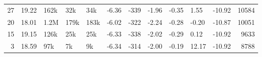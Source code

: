 \begin{table}[ht]
\begin{tabularx}{\textwidth}{@{} r *{10}{X} r @{}}
        \footnotesize 27 & 
        \cellcolor[HTML]{FFFFFF}\footnotesize 19.22 & 
        \cellcolor[HTML]{FFFFFF}\footnotesize 162k & 
        \cellcolor[HTML]{FDFFFE}\footnotesize 32k & 
        \cellcolor[HTML]{FDFEFE}\footnotesize 34k & 
        \cellcolor[HTML]{FFFFFF}\footnotesize -6.36 & 
        \cellcolor[HTML]{FFFFFF}\footnotesize -339 & 
        \cellcolor[HTML]{E2F4EB}\footnotesize -1.96 & 
        \footnotesize -0.35 & 
        \cellcolor[HTML]{A0D9BD}\footnotesize 1.55 & 
        \cellcolor[HTML]{F3FBF7}\footnotesize -10.92 & 
        \footnotesize 10584 \\

        \footnotesize 20 & 
        \cellcolor[HTML]{EDF7F2}\footnotesize 18.01 & 
        \cellcolor[HTML]{F5FBF8}\footnotesize 1.2M & 
        \cellcolor[HTML]{EFF9F4}\footnotesize 179k & 
        \cellcolor[HTML]{EDF8F3}\footnotesize 183k & 
        \cellcolor[HTML]{F6FCF9}\footnotesize -6.02 & 
        \cellcolor[HTML]{FAFDFC}\footnotesize -322 & 
        \cellcolor[HTML]{E3F4EC}\footnotesize -2.24 & 
        \footnotesize -0.28 & 
        \cellcolor[HTML]{ACDEC5}\footnotesize -0.20 & 
        \cellcolor[HTML]{F2FAF6}\footnotesize -10.87 & 
        \footnotesize 10051 \\

        \footnotesize 15 & 
        \cellcolor[HTML]{FDFEFE}\footnotesize 19.15 & 
        \cellcolor[HTML]{FFFFFF}\footnotesize 126k & 
        \cellcolor[HTML]{FEFFFE}\footnotesize 25k & 
        \cellcolor[HTML]{FEFFFE}\footnotesize 25k & 
        \cellcolor[HTML]{FFFFFF}\footnotesize -6.33 & 
        \cellcolor[HTML]{FFFFFF}\footnotesize -338 & 
        \cellcolor[HTML]{E2F4EB}\footnotesize -2.02 & 
        \footnotesize -0.29 & 
        \cellcolor[HTML]{AADDC4}\footnotesize 0.12 & 
        \cellcolor[HTML]{F3FBF7}\footnotesize -10.92 & 
        \footnotesize 9633 \\

        \footnotesize 3 & 
        \cellcolor[HTML]{F5FBF8}\footnotesize 18.59 & 
        \cellcolor[HTML]{FFFFFF}\footnotesize 97k & 
        \cellcolor[HTML]{FFFFFF}\footnotesize 7k & 
        \cellcolor[HTML]{FFFFFF}\footnotesize 9k & 
        \cellcolor[HTML]{FFFFFF}\footnotesize -6.34 & 
        \cellcolor[HTML]{F9FDFB}\footnotesize -314 & 
        \cellcolor[HTML]{E2F4EB}\footnotesize -2.00 & 
        \footnotesize -0.19 & 
        \cellcolor[HTML]{57BB8A}\footnotesize 12.17 & 
        \cellcolor[HTML]{F3FBF7}\footnotesize -10.92 & 
        \footnotesize 8788 \\


\end{tabularx}
\end{table}
